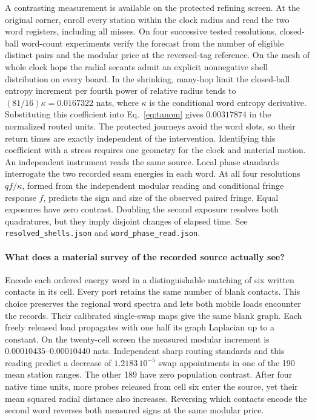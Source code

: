 \documentclass[11pt]{article}
\begin{document}
A contrasting measurement is available on the protected refining screen.
At the original corner, enroll every station within the clock radius
and read the two word registers, including all misses. On four
successive tested resolutions, closed-ball word-count experiments verify
the forecast from the number of eligible distinct pairs and the modular
price at the reversed-tag reference. On the mesh of whole clock hops
the radial secants admit an explicit nonnegative shell distribution on
every board. In the shrinking, many-hop limit the closed-ball entropy
increment per fourth power of relative radius tends to
\((81/16)\kappa=0.0167322\) nats, where \(\kappa\) is the conditional
word entropy derivative. Substituting this coefficient into
Eq.~\eqref{eq:tanom} gives \(0.00317874\) in the normalized routed
units. The protected journeys avoid the word slots, so their return
times are exactly independent of the intervention. Identifying this
coefficient with a stress requires one geometry for the clock and
material motion. An independent instrument reads the same source.
Local phase standards interrogate the two recorded seam energies in
each word. At all four resolutions \(q f/\kappa\), formed from the
independent modular reading and conditional fringe response \(f\),
predicts the sign and size of the observed paired fringe. Equal
exposures have zero contrast. Doubling the second exposure resolves
both quadratures, but they imply disjoint changes of elapsed time.
See \texttt{resolved\_shells.json} and \texttt{word\_phase\_read.json}.

\paragraph{What does a material survey of the recorded source actually see?}
Encode each ordered energy word in a distinguishable matching of six
written contacts in its cell. Every port retains the same number of
blank contacts. This choice preserves the regional word spectra and lets
both mobile loads encounter the records. Their calibrated single-swap
maps give the same blank graph. Each freely released load propagates
with one half its graph Laplacian up to a constant. On the twenty-cell
screen the measured modular increment is
\(0.00010435\)--\(0.00010440\) nats. Independent sharp routing standards
and this reading predict a decrease of \(1.2183\,10^{-5}\) swap
appointments in one of the 190 mean station ranges. The other 189 have
zero population contrast. After four native time units, more probes
released from cell six enter the source, yet their mean squared radial
distance also increases. Reversing which contacts encode the second
word reverses both measured signs at the same modular price.
\end{document}
